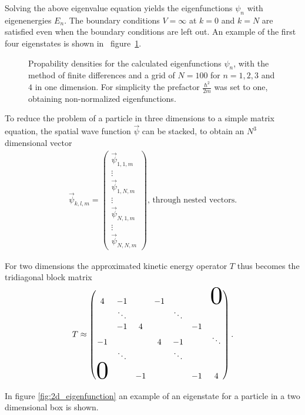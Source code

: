 \documentclass[10pt,a4paper]{article} %
\begin{document}
Solving the above eigenvalue equation yields the eigenfunctions $\psi_n$ with eigenenergies $E_n$. The boundary conditions $V = \infty$ at $k=0$ and $k=N$ are satisfied even when the boundary conditions are left out. An example of the first four eigenstates is shown in \mbox{ figure \ref{fig:eigenfunctions}.}
\begin{figure}[!htb]
	\Huge
	\centering
	\resizebox{!}{0.6\textwidth}{}
	\caption{Propability densities for the calculated eigenfunctions $\psi_n$, with the method of finite differences and a grid of $N=100$ for $n = 1,2,3$ and $4$ in one dimension. For simplicity the prefactor $\frac{\hbar^2}{2m}$ was set to one, obtaining non-normalized eigenfunctions.}
	\label{fig:eigenfunctions}
\end{figure} 
To reduce the problem of a particle in three dimensions to a simple matrix equation, the spatial wave function $\vec{\psi}$ can be stacked, to obtain an $N^3$ dimensional vector
\begin{align}
\vec{\psi}_{k,l,m} = \begin{pmatrix}\vec{\psi}_{1,1,m} \\ \vdots \\ \vec{\psi}_{1,N,m} \\ \vdots \\ \vec{\psi}_{N,1,m} \\ \vdots \\ \vec{\psi}_{N,N,m} \end{pmatrix} \text{, through nested vectors.}
\end{align}

For two dimensions the approximated kinetic energy operator $T$ thus becomes the tridiagonal block matrix
\begin{align}
T \approx  \begin{pmatrix}
4	& -1	&  &  -1	 &     &     &  \scalebox{3}{$0$}  \\
    & \ddots	&     & 		&   \ddots   & 	& \\
    & -1 & 4 &  &  &-1 \\
-1 &      &          & 4     & -1       & & \ddots \\
    & \ddots &     &&    \ddots   &       &  \\
  \scalebox{3}{$0$}   &      & -1       &&         & -1     & 4 \\ 
\end{pmatrix} \text{.}
\end{align}

In figure \ref{fig:2d_eigenfunction} an example of an eigenstate for a particle in a two dimensional box is shown.
\end{document}
